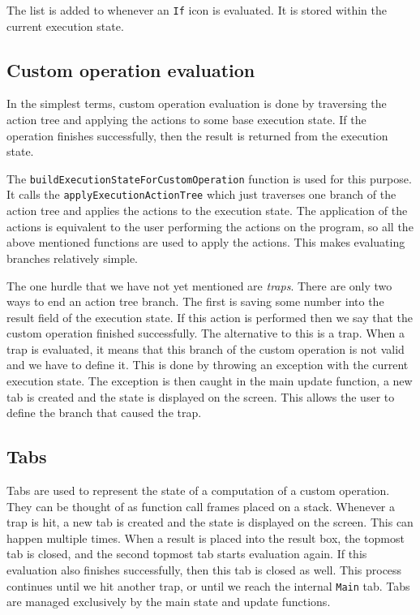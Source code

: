 \documentclass{report}
\begin{document}
The list is added to whenever an \texttt{If} icon is evaluated. It is stored within the current execution state.

\subsection*{Custom operation evaluation}
In the simplest terms, custom operation evaluation is done by traversing the action tree and applying the actions to some base execution state.
If the operation finishes successfully, then the result is returned from the execution state.

The \texttt{buildExecutionStateForCustomOperation} function is used for this purpose.
It calls the \texttt{applyExecutionActionTree} which just traverses one branch of the action tree and applies the actions to the execution state.
The application of the actions is equivalent to the user performing the actions on the program, so all the above mentioned functions are used to apply the actions.
This makes evaluating branches relatively simple.

The one hurdle that we have not yet mentioned are \emph{traps}. There are only two ways to end an action tree branch.
The first is saving some number into the result field of the execution state. If this action is performed then we say that the custom operation finished successfully.
The alternative to this is a trap. When a trap is evaluated, it means that this branch of the custom operation is not valid and we have to define it.
This is done by throwing an exception with the current execution state. The exception is then caught in the main update function, a new tab is created and the state is displayed on the screen.
This allows the user to define the branch that caused the trap.

\subsection*{Tabs}
Tabs are used to represent the state of a computation of a custom operation. They can be thought of as function call frames placed on a stack.
Whenever a trap is hit, a new tab is created and the state is displayed on the screen. This can happen multiple times.
When a result is placed into the result box, the topmost tab is closed, and the second topmost tab starts evaluation again.
If this evaluation also finishes successfully, then this tab is closed as well. This process continues until we hit another trap, or until we reach the internal \texttt{Main} tab.
Tabs are managed exclusively by the main state and update functions.
\end{document}
